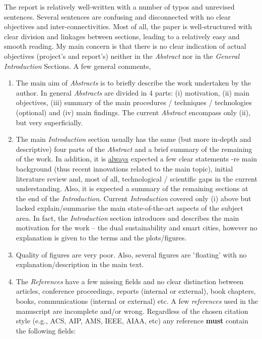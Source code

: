 \documentclass[14pt,twoside]{report}
\begin{document}
The report is relatively well-written with a number of typos and unrevised sentences. Several sentences are confusing and disconnected with no clear objectives and inter-connectivities. Most of all, the paper is well-structured with clear division and linkages between sections, leading to a relatively easy and smooth reading. My main concern is that there is no clear indication of actual objectives (project's and report's) neither in the {\it Abstract} nor in the {\it General Introduction} Sections. A few general comments,
\begin{enumerate}
%
\item The main aim of {\it Abstracts} is to briefly describe the work undertaken by the author. In general {\it Abstracts} are divided in 4 parts: (i) motivation, (ii) main objectives, (iii) summary of the main procedures / techniques / technologies (optional) and (iv) main findings. The current {\it Abstract} encompass only (ii), but very superficially. 
%
\item The main {\it Introduction} section usually has the same (but more in-depth and descriptive) four parts of the {\it Abstract} and a brief summary of the remaining of the work. In addition, it is \underline{always} expected a few clear statements -re main background (thus recent innovations related to the main topic), initial literature review and, most of all, technological / scientific gaps in the current understanding. Also, it is expected a summary of the remaining sections at the end of the {\it Introduction}.  Current {\it Introduction} covered only (i) above but lacked explain/summarise the main state-of-the-art aspects of the subject area. In fact, the {\it Introduction} section introduces and describes the main motivation for the work -- the dual sustainability and smart cities, however no explanation is given to the terms and the plots/figures. 
%
\item Quality of figures are very poor. Also, several figures are $\lq$floating' with no explanation/description in the main text.
%
\item The {\it References} have  a few missing fields and no clear distinction between articles, conference proceedings, reports (internal or external), book chapters, books, communications (internal or external) etc.  A few {\it references} used in the manuscript are incomplete and/or wrong. Regardless of the chosen citation style (e.g., ACS, AIP, AMS, IEEE, AIAA, etc) any reference {\bf must} contain the following fields: 
\begin{enumerate}

\end{enumerate}
\end{enumerate}
\end{document}
